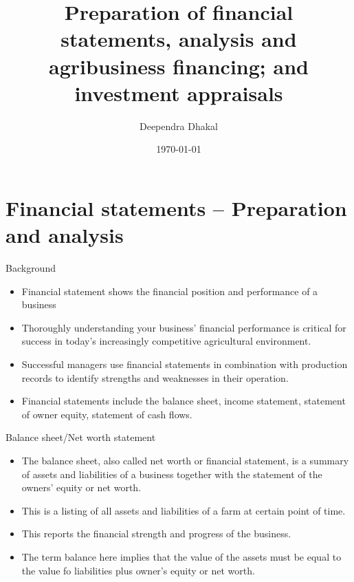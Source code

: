 \documentclass[12pt,ignorenonframetext,aspectratio=169]{beamer}
\title{\insertsectionhead}
  {
    \definecolor{white}{rgb}{0.776,0.357,0.157}
    \definecolor{iqss@orange}{rgb}{1,1,1}
    \ifnum \insertmainframenumber > \insertframenumber
    \frame{
      \frametitle{\iqsssectiontitleheader}
      \tableofcontents[currentsection]
    }
    \else
    \frame{
      \frametitle{Backup Slides}
      \tableofcontents[sectionstyle=shaded/shaded,subsectionstyle=shaded/shaded/shaded]
    }
    \fi
  }
\title[]{Preparation of financial statements, analysis and
agribusiness financing; and investment appraisals}
\author[
        Deependra Dhakal
    ]{Deependra Dhakal}
\institute[
    ]{
    GAASC, Baitadi \and Tribhuwan University
    }
\date[
      \today
  ]{
      \today
        }
\providecommand{\tightlist}{%
  \setlength{\itemsep}{0pt}\setlength{\parskip}{0pt}}
\begin{document}
  \begin{frame}[plain]
  \titlepage
  \end{frame}



\hypertarget{financial-statements-preparation-and-analysis}{%
\section{Financial statements -- Preparation and
analysis}\label{financial-statements-preparation-and-analysis}}

\begin{frame}{Background}
\protect\hypertarget{background}{}
\begin{itemize}
\tightlist
\item
  Financial statement shows the financial position and performance of a
  business
\item
  Thoroughly understanding your business' financial performance is
  critical for success in today's increasingly competitive agricultural
  environment.
\item
  Successful managers use financial statements in combination with
  production records to identify strengths and weaknesses in their
  operation.
\item
  Financial statements include the balance sheet, income statement,
  statement of owner equity, statement of cash flows.
\end{itemize}
\end{frame}

\begin{frame}{Balance sheet/Net worth statement}
\protect\hypertarget{balance-sheetnet-worth-statement}{}
\begin{itemize}
\tightlist
\item
  The balance sheet, also called net worth or financial statement, is a
  summary of assets and liabilities of a business together with the
  statement of the owners' equity or net worth.
\item
  This is a listing of all assets and liabilities of a farm at certain
  point of time.
\item
  This reports the financial strength and progress of the business.
\item
  The term balance here implies that the value of the assets must be
  equal to the value fo liabilities plus owner's equity or net worth.
\end{itemize}
\end{frame}
\end{document}
